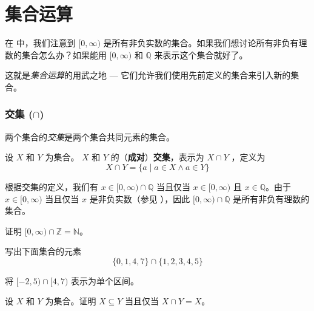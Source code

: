 \section{集合运算}

在  中，我们注意到 $[0,\infty)$ 是所有非负实数的集合。如果我们想讨论所有非负有理数的集合怎么办？如果能用 $[0,\infty)$ 和 $\mathbb{Q}$ 来表示这个集合就好了。

这就是\textit{集合运算}的用武之地 --- 它们允许我们使用先前定义的集合来引入新的集合。

\subsubsection*{交集 ($\cap$)}
两个集合的\textit{交集}是两个集合共同元素的集合。

\begin{definition}
\label{defIntersection}
设 $X$ 和 $Y$ 为集合。 $X$ 和 $Y$ 的（\textbf{成对}）\textbf{交集}，表示为 $X \cap Y$ ，定义为
\[ X \cap Y = \{ a \mid a \in X \wedge a \in Y \} \]
\end{definition}

\begin{example}
根据交集的定义，我们有 $x \in [0,\infty) \cap \mathbb{Q}$ 当且仅当 $x \in [0,\infty)$ 且 $x \in \mathbb{Q} $。由于 $x \in [0,\infty)$ 当且仅当 $x$ 是非负实数（参见 ），因此 $[0,\infty) \cap \mathbb{ Q}$ 是所有非负有理数的集合。
\end{example}

\begin{exercise}
证明 $[0,\infty) \cap \mathbb{Z} = \mathbb{N}$。
\end{exercise}

\begin{exercise}
写出下面集合的元素
\[ \{ 0, 1, 4, 7 \} \cap \{ 1, 2, 3, 4, 5 \} \]
\end{exercise}

\begin{exercise}
将 $[-2,5) \cap [4,7)$ 表示为单个区间。
\end{exercise}

\begin{proposition}
\label{propSubsetFromIntersection}
设 $X$ 和 $Y$ 为集合。证明 $X \subseteq Y$ 当且仅当 $X \cap Y = X$。
\end{proposition}

